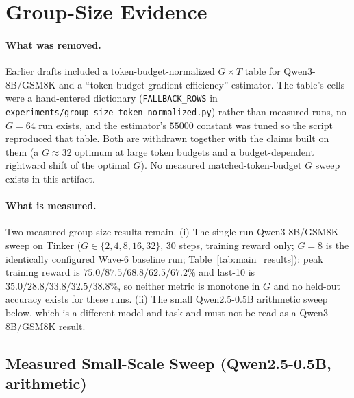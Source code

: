 \section{Group-Size Evidence}
\label{sec:appendix:group-size-reconcile}

\paragraph{What was removed.}
Earlier drafts included a token-budget-normalized $G\times T$ table for
Qwen3-8B/GSM8K and a ``token-budget gradient efficiency'' estimator. The
table's cells were a hand-entered dictionary (\texttt{FALLBACK\_ROWS} in
\texttt{experiments/\allowbreak{}group\_size\_token\_normalized.py}) rather than measured
runs, no $G{=}64$ run exists, and the estimator's $55000$ constant was tuned
so the script reproduced that table. Both are withdrawn together with the
claims built on them (a $G{\approx}32$ optimum at large token budgets and a
budget-dependent rightward shift of the optimal $G$). No measured
matched-token-budget $G$ sweep exists in this artifact.

\paragraph{What is measured.}
Two measured group-size results remain. (i) The single-run Qwen3-8B/GSM8K
sweep on Tinker ($G\in\{2,4,8,16,32\}$, 30 steps, training reward only;
$G{=}8$ is the identically configured Wave-6 baseline run;
Table~\ref{tab:main_results}): peak training reward is
$75.0/87.5/68.8/62.5/67.2\%$ and last-10 is $35.0/28.8/33.8/32.5/38.8\%$, so neither
metric is monotone in $G$ and no held-out accuracy exists for these runs.
(ii) The small Qwen2.5-0.5B arithmetic sweep below, which is a different
model and task and must not be read as a Qwen3-8B/GSM8K result.

\subsection{Measured Small-Scale Sweep (Qwen2.5-0.5B, arithmetic)}
\label{sec:appendix:group-size-measured}

